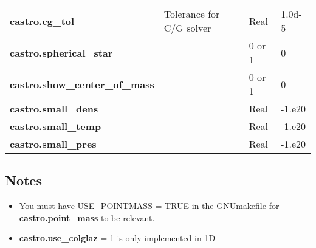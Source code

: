 \begin{table*}[h]
\begin{scriptsize}
\begin{center}
\begin{tabular}{|l|p{3.0in}|l|l|}
{\bf castro.cg\_tol} & Tolerance for C/G solver & Real & 1.0d-5 \\
{\bf castro.spherical\_star} & & 0 or 1 & 0 \\
{\bf castro.show\_center\_of\_mass} & & 0 or 1 & 0 \\
{\bf castro.small\_dens} & & Real & -1.e20 \\
{\bf castro.small\_temp} & & Real & -1.e20 \\
{\bf castro.small\_pres} & & Real & -1.e20 \\
\hline
\end{tabular}
\label{Table:Physics}
\end{center}
\end{scriptsize}
\end{table*}

\subsection{Notes}

\begin{itemize}
\item You must have USE\_POINTMASS  = TRUE in the GNUmakefile for {\bf castro.point\_mass} to be relevant.
\item {\bf castro.use\_colglaz}  = 1 is only implemented in 1D
\end{itemize}



